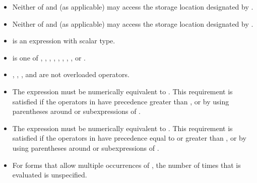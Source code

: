 \begin{ccppspecific}
\begin{itemize}
\item Neither of  and  (as applicable) may access the storage location designated by .

\item Neither of  and  (as applicable) may access the storage location designated by .

\item {} is an expression with scalar type.

\item {} is one of \code{+}, \code{*}, \code{-}, \code{/},
\code{&}, \code{^}, \code{|}, \code{<<}, or
\code{>>}.

\item {}, \code{=}, \code{++}, and \code{--} are not overloaded operators.

\item The expression    must be numerically equivalent to
  . This
requirement is satisfied if the operators in  have precedence greater than ,
or by using parentheses around  or subexpressions of .

\item The expression    must be numerically equivalent to
  . This
requirement is satisfied if the operators in  have precedence equal to or greater
than , or by using parentheses around  or subexpressions of .

\item For forms that allow multiple occurrences of , the number of times that  is
evaluated is unspecified.
\end{itemize}

\end{ccppspecific}

